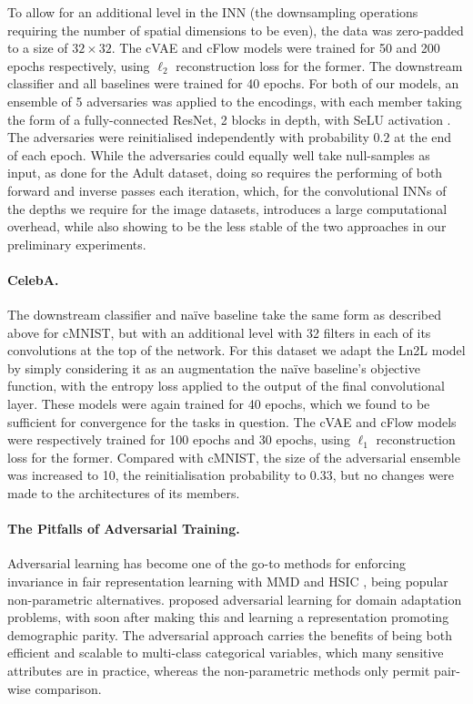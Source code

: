 To allow for an additional level in the INN (the downsampling operations requiring the number of spatial dimensions to be even), the data was zero-padded to a size of $32\times32$. The cVAE and cFlow models were trained for 50 and 200 epochs respectively, using $\ell_2$ reconstruction loss for the former. The downstream classifier and all baselines were trained for 40 epochs. For both of our models, an ensemble of 5 adversaries was applied to the encodings, with each member taking the form of a fully-connected ResNet, 2 blocks in depth, with SeLU activation \citep{klambauer2017self}. The adversaries were reinitialised independently with probability $0.2$ at the end of each epoch. While the adversaries could equally well take  null-samples as input, as done for the Adult dataset, doing so requires the performing of both forward and inverse passes each iteration, which, for the convolutional INNs of the depths we require for the image datasets, introduces a large computational overhead, while also showing to be the less stable of the two approaches in our preliminary experiments.

\paragraph{CelebA.} 
The downstream classifier and na\"ive baseline take the same form as described above for cMNIST, but with an additional level with 32 filters in each of its convolutions at the top of the network. For this dataset we adapt the Ln2L model by simply considering it as an augmentation the na\"ive baseline's objective function, with the entropy loss applied to the output of the final convolutional layer. These models were again trained for 40 epochs, which we found to be sufficient for convergence for the tasks in question. The cVAE and cFlow models were respectively trained for 100 epochs and 30 epochs, using $\ell_1$ reconstruction loss for the former. Compared with cMNIST, the size of the adversarial ensemble was increased to 10, the reinitialisation probability to 0.33, but no changes were made to the architectures of its members.

\paragraph{The Pitfalls of Adversarial Training.}
Adversarial learning has become one of the go-to methods for enforcing invariance in fair representation learning \citep{ganin2016domain} with MMD \citep{louizos2016variational} and HSIC \citep{QuaShaTho19}, being popular non-parametric alternatives.
\citet{ganin2016domain} proposed adversarial learning for domain adaptation problems, with \citet{edwards2016censoring} soon after making this and learning a representation promoting demographic parity.
The adversarial approach carries the benefits of being both efficient and scalable to multi-class categorical variables, which many sensitive attributes are in practice, whereas the non-parametric methods only permit pair-wise comparison.


